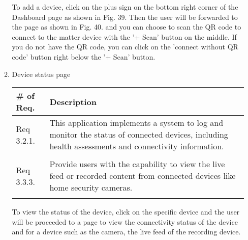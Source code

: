\begin{enumerate}[label=\arabic*.]
\begin{enumerate}[label*={\arabic*.},ref=\theenumi.\arabic*]
              To add a device, click on the plus sign on the bottom right corner of the Dashboard page as shown in Fig. 39. Then the user will be forwarded to the page as shown in Fig. 40. and you can choose to scan the QR code to connect to the matter device with the '+ Scan' button on the middle. If you do not have the QR code, you can click on the 'connect without QR code' button right below the '+ Scan' button. \\
              \newpage
              \item Device status page
              \begin{table}[H]
                        \center
                        \begin{tabular}{m{1.4cm} m{5.5cm}}
                            \toprule
                            \# of Req. & Description                                                                                                                   \\
                            \midrule
                            Req 3.2.1.   & This application implements a system to log and monitor the status of connected devices, including health assessments and connectivity information. \\\\
                            Req 3.3.3.   & Provide users with the capability to view the live feed or recorded content from connected devices like home security cameras.                     \\\\
                            \bottomrule
                        \end{tabular}
                    \end{table}
                
              To view the status of the device, click on the specific device and the user will be proceeded to a page to view the connectivity status of the device and for a device such as the camera, the live feed of the recording device. \\


\end{enumerate}
\end{enumerate}
